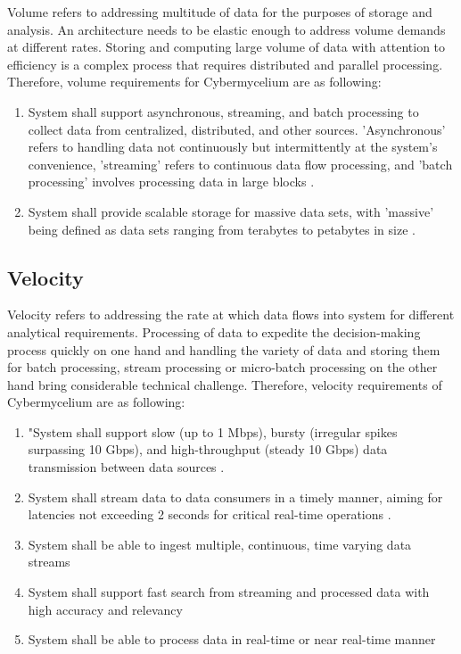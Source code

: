 \documentclass[review]{elsarticle}
\begin{document}
Volume refers to addressing multitude of data for the purposes of storage and analysis. An architecture needs to be elastic enough to address volume demands at different rates. Storing and computing large volume of data with attention to efficiency is a complex process that requires distributed and parallel processing. Therefore, volume requirements for Cybermycelium are as following:


\begin{enumerate}[label=\textbf{Vol-\arabic*}]
    \item System shall support asynchronous, streaming, and batch processing to collect data from centralized, distributed, and other sources. 'Asynchronous' refers to handling data not continuously but intermittently at the system's convenience, 'streaming' refers to continuous data flow processing, and 'batch processing' involves processing data in large blocks \cite{reis2022fundamentals}.
    \item System shall provide scalable storage for massive data sets, with 'massive' being defined as data sets ranging from terabytes to petabytes in size \cite{reis2022fundamentals}.
\end{enumerate}


\subsection{Velocity}

Velocity refers to addressing the rate at which data flows into system for different analytical requirements. Processing of data to expedite the decision-making process quickly on one hand and handling the variety of data and storing them for batch processing, stream processing or micro-batch processing on the other hand bring considerable technical challenge. Therefore, velocity requirements of Cybermycelium are as following: 

\begin{enumerate}[label=\textbf{Vel-\arabic*}]
    \item "System shall support slow (up to 1 Mbps), bursty (irregular spikes surpassing 10 Gbps), and high-throughput (steady 10 Gbps) data transmission between data sources \cite{kleppmann2017designing}.
    \item System shall stream data to data consumers in a timely manner, aiming for latencies not exceeding 2 seconds for critical real-time operations \cite{ryzko2020modern}.
    \item System shall be able to ingest multiple, continuous, time varying data streams
    \item System shall support fast search from streaming and processed data with high accuracy and relevancy
    \item System shall be able to process data in real-time or near real-time manner
\end{enumerate}
\end{document}
